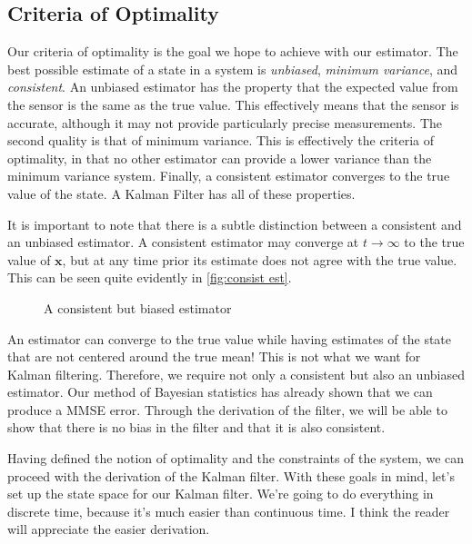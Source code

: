 \subsection{Criteria of Optimality}

Our criteria of optimality is the goal we hope to achieve with our estimator. The best possible estimate of a state in a system is \textit{unbiased}, \textit{minimum variance}, and \textit{consistent}. An unbiased estimator has the property that the expected value from the sensor is the same as the true value. This effectively means that the sensor is accurate, although it may not provide particularly precise measurements. The second quality is that of minimum variance. This is effectively the criteria of optimality, in that no other estimator can provide a lower variance than the minimum variance system. Finally, a consistent estimator converges to the true value of the state. A Kalman Filter has all of these properties.

It is important to note that there is a subtle distinction between a consistent and an unbiased estimator. A consistent estimator may converge at $t\rightarrow\infty$ to the true value of $\bm{x}$, but at any time prior its estimate does not agree with the true value. This can be seen quite evidently in \autoref{fig:consist est}.

\begin{figure}[ht]
    \centering
    
    \caption{A consistent but biased estimator \cite{stpasha_consistent_nodate}}
    \label{fig:consist est}
\end{figure}

An estimator can converge to the true value while having estimates of the state that are not centered around the true mean! This is not what we want for Kalman filtering. Therefore, we require not only a consistent but also an unbiased estimator. Our method of Bayesian statistics has already shown that we can produce a MMSE error. Through the derivation of the filter, we will be able to show that there is no bias in the filter and that it is also consistent.

Having defined the notion of optimality and the constraints of the system, we can proceed with the derivation of the Kalman filter. With these goals in mind, let's set up the state space for our Kalman filter. We're going to do everything in discrete time, because it's much easier than continuous time. I think the reader will appreciate the easier derivation.

